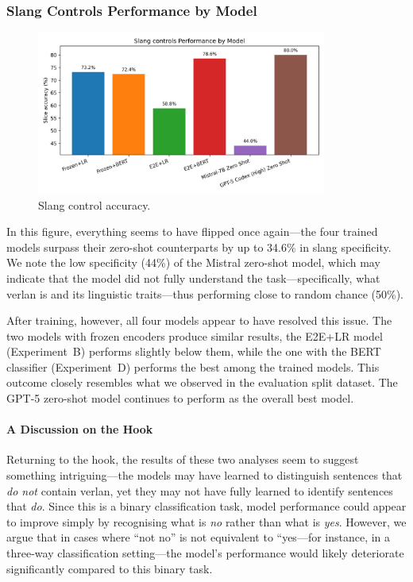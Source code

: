 \documentclass[12pt]{article}
\begin{document}
\subsubsection{Slang Controls Performance by Model}

\begin{figure}[htbp]
    \centering
    \includegraphics[width=0.85\textwidth]{figures/slang_controls_comparison.png}
    \caption{Slang control accuracy.}
    \label{fig:slang-comparison}
\end{figure}

In this figure, everything seems to have flipped once again\;---\;the four trained models surpass their zero-shot counterparts by up to 34.6\% in slang specificity. 
We note the low specificity (44\%) of the Mistral zero-shot model, which may indicate that the model did not fully understand the task\;---\;specifically, what verlan is and its linguistic traits\;---\;thus performing close to random chance (50\%).

After training, however, all four models appear to have resolved this issue. 
The two models with frozen encoders produce similar results, the E2E+LR model (Experiment~B) performs slightly below them, while the one with the BERT classifier (Experiment~D) performs the best among the trained models. 
This outcome closely resembles what we observed in the evaluation split dataset. 
The GPT-5 zero-shot model continues to perform as the overall best model.

\paragraph{A Discussion on the Hook}
Returning to the hook, the results of these two analyses seem to suggest something intriguing\;---\;the models may have learned to distinguish sentences that \textit{do not} contain verlan, yet they may not have fully learned to identify sentences that \textit{do}. 
Since this is a binary classification task, model performance could appear to improve simply by recognising what is \textit{no} rather than what is \textit{yes}. 
However, we argue that in cases where ``not no'' is not equivalent to ``yes\;---\;for instance, in a three-way classification setting\;---\;the model's performance would likely deteriorate significantly compared to this binary task.
\end{document}
